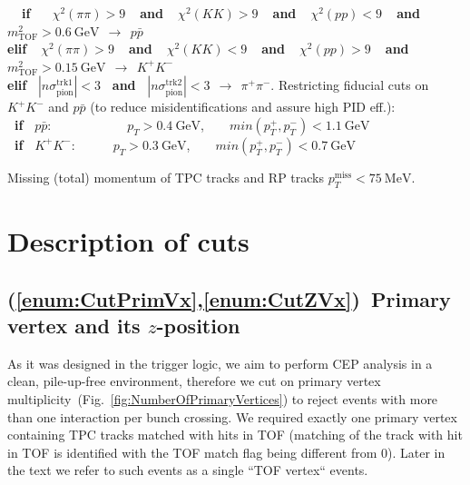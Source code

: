 \begin{enumerate}[label=\textbf{\hyperref[sec:C\arabic*]{C\arabic*}},ref=C\arabic*]
\begin{enumerate}[label=\textbf{\theenumi.\arabic*},ref=\theenumi.\arabic*]
        \textbf{~~if~~~}\hspace*{4.5pt}$\chi^{2}(\pi\pi)>9$\textbf{~~and~~}$\chi^{2}(KK)>9$\textbf{~~and~~}$\chi^{2}(pp)<9$\textbf{~~and~~}$m^{2}_{\text{TOF}}>0.6~\text{GeV}~~\rightarrow~~p\bar{p}$\\[5pt]%
        \textbf{elif~~}$\chi^{2}(\pi\pi)>9$\textbf{~~and~~}$\chi^{2}(KK)<9$\textbf{~~and~~}$\chi^{2}(pp)>9$\textbf{~~and~~}$m^{2}_{\text{TOF}}>0.15~\text{GeV}~~\rightarrow~~K^{+}K^{-}$\\[5pt]%
        \textbf{elif~} $|n\sigma_{\text{pion}}^{\text{trk1}}|<3$ \textbf{~and~} $|n\sigma_{\text{pion}}^{\text{trk2}}|<3~~\rightarrow~~\pi^{+}\pi^{-}$.%
      \itemm Restricting fiducial cuts on $K^{+}K^{-}$ and $p\bar{p}$ (to reduce misidentifications and assure high PID eff.):\label{enum:CutPidPtLimits}\\[2pt]
      \textbf{~if~} $p\bar{p}$:~~~~~~~~~~~~\hspace*{1.7pt}$p_{T}>0.4~\text{GeV}$,~~~~$min(p_{T}^{+},p_{T}^{-})<1.1~\text{GeV}$\\%
      \textbf{~if~} $K^{+}K^{-}$:~~~~~~$p_{T}>0.3~\text{GeV}$,~~~~$min(p_{T}^{+},p_{T}^{-})<0.7~\text{GeV}$%
\end{enumerate}
\itemm Missing (total) momentum of TPC tracks and RP tracks $p_{T}^{\text{miss}}<75~\text{MeV}$.\label{enum:CutMissingPt}%
 
\end{enumerate}
%
%
%
%
%
\section{Description of cuts}\label{sec:descriptionOfCuts}%
%
\subsection{(\ref{enum:CutPrimVx},\ref{enum:CutZVx})~Primary vertex and its \texorpdfstring{$z$}{z}-position}\label{sec:C1}\label{sec:C2}
As it was designed in the trigger logic, we aim to perform CEP analysis in a clean, pile-up-free environment, therefore we cut on primary vertex multiplicity~(Fig.~\ref{fig:NumberOfPrimaryVertices}) to reject events with more than one interaction per bunch crossing. We required exactly one primary vertex containing TPC tracks matched with hits in TOF (matching of the track with hit in TOF is identified with the TOF match flag being different from 0). Later in the text we refer to such events as a single ``TOF vertex`` events.

